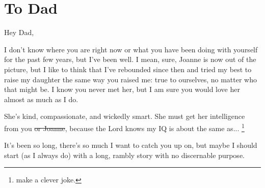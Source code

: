 \chapter{To Dad}

\noindent Hey Dad,

I don't know where you are right now or what you have been doing with yourself for the past few years, but I've been well.
I mean, sure, Joanne is now out of the picture, but I like to think that I've rebounded since then and tried my best to raise my daughter the same way you raised me: true to ourselves, no matter who that might be.
I know you never met her, but I am sure you would love her almost as much as I do.

She's kind, compassionate, and wickedly smart.
She must get her intelligence from you \sout{or Joanne}, because the Lord knows my IQ is about the same as... \footnote{make a clever joke.} 

It's been so long, there's so much I want to catch you up on, but maybe I should start (as I always do) with a long, rambly story with no discernable purpose.

